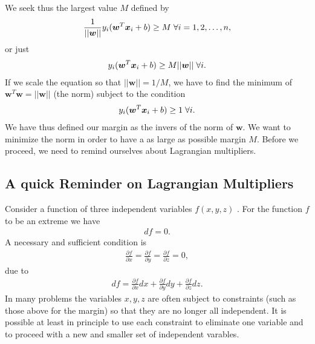 \documentclass[letterpaper,10pt,english]{sphinxmanual}
\begin{document}
We seek thus the largest value \(M\) defined by
\begin{equation*}
\begin{split}
\frac{1}{\vert \vert \boldsymbol{w}\vert\vert}y_i(\boldsymbol{w}^T\boldsymbol{x}_i+b) \geq M \hspace{0.1cm}\forall i=1,2,\dots, n,
\end{split}
\end{equation*}
or just
\begin{equation*}
\begin{split}
y_i(\boldsymbol{w}^T\boldsymbol{x}_i+b) \geq M\vert \vert \boldsymbol{w}\vert\vert \hspace{0.1cm}\forall i.
\end{split}
\end{equation*}
If we scale the equation so that \(\vert \vert \boldsymbol{w}\vert\vert = 1/M\), we have to find the minimum of
\(\boldsymbol{w}^T\boldsymbol{w}=\vert \vert \boldsymbol{w}\vert\vert\) (the norm) subject to the condition
\begin{equation*}
\begin{split}
y_i(\boldsymbol{w}^T\boldsymbol{x}_i+b) \geq 1 \hspace{0.1cm}\forall i.
\end{split}
\end{equation*}
We have thus defined our margin as the invers of the norm of
\(\boldsymbol{w}\). We want to minimize the norm in order to have a as large as
possible margin \(M\). Before we proceed, we need to remind ourselves
about Lagrangian multipliers.


\subsection{A quick Reminder on Lagrangian Multipliers}
\label{\detokenize{chapter7:a-quick-reminder-on-lagrangian-multipliers}}
Consider a function of three independent variables \(f(x,y,z)\) . For the function \(f\) to be an
extreme we have
\begin{equation*}
\begin{split}
df=0.
\end{split}
\end{equation*}
A necessary and sufficient condition is
\begin{equation*}
\begin{split}
\frac{\partial f}{\partial x} =\frac{\partial f}{\partial y}=\frac{\partial f}{\partial z}=0,
\end{split}
\end{equation*}
due to
\begin{equation*}
\begin{split}
df = \frac{\partial f}{\partial x}dx+\frac{\partial f}{\partial y}dy+\frac{\partial f}{\partial z}dz.
\end{split}
\end{equation*}
In many problems the variables \(x,y,z\) are often subject to constraints (such as those above for the margin)
so that they are no longer all independent. It is possible at least in principle to use each
constraint to eliminate one variable
and to proceed with a new and smaller set of independent varables.
\end{document}
